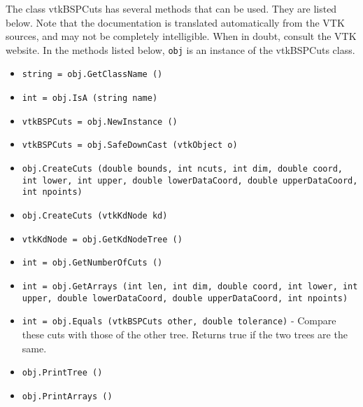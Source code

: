 The class vtkBSPCuts has several methods that can be used.
  They are listed below.
Note that the documentation is translated automatically from the VTK sources,
and may not be completely intelligible.  When in doubt, consult the VTK website.
In the methods listed below, \verb|obj| is an instance of the vtkBSPCuts class.
\begin{itemize}
\item  \verb|string = obj.GetClassName ()|

\item  \verb|int = obj.IsA (string name)|

\item  \verb|vtkBSPCuts = obj.NewInstance ()|

\item  \verb|vtkBSPCuts = obj.SafeDownCast (vtkObject o)|

\item  \verb|obj.CreateCuts (double bounds, int ncuts, int dim, double coord, int lower, int upper, double lowerDataCoord, double upperDataCoord, int npoints)|

\item  \verb|obj.CreateCuts (vtkKdNode kd)|

\item  \verb|vtkKdNode = obj.GetKdNodeTree ()|

\item  \verb|int = obj.GetNumberOfCuts ()|

\item  \verb|int = obj.GetArrays (int len, int dim, double coord, int lower, int upper, double lowerDataCoord, double upperDataCoord, int npoints)|

\item  \verb|int = obj.Equals (vtkBSPCuts other, double tolerance)| -  Compare these cuts with those of the other tree.  Returns true if
 the two trees are the same.

\item  \verb|obj.PrintTree ()|

\item  \verb|obj.PrintArrays ()|

\end{itemize}
